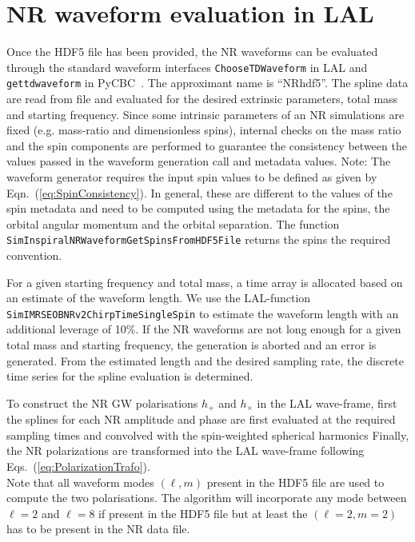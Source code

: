 \documentclass[11pt,tightenlines,article,amssymb,amsmath,amsfonts,superscriptaddress,nofootinbib]{revtex4}
\begin{document}
\section{NR waveform evaluation in LAL}
\label{sec:gen}
Once the HDF5 file has been provided, the NR waveforms can be evaluated through the standard waveform interfaces \texttt{ChooseTDWaveform} in LAL and \texttt{get\textunderscore td\textunderscore waveform} in PyCBC~\cite{Canton:2014ena}. The approximant name is ``NR\textunderscore hdf5''. 
The spline data are read from file and evaluated for the desired extrinsic parameters, total mass and starting frequency. Since some intrinsic parameters of an NR simulations are fixed (e.g. mass-ratio and dimensionless spins), internal checks on the mass ratio and the spin components are performed to guarantee the consistency between the values passed in the waveform generation call and metadata values. 
Note: The waveform generator requires the input spin values to be defined as given by Eqn.~(\ref{eq:SpinConsistency}). In general, these are different to the values of the spin metadata and need to be computed using the metadata for the spins, the orbital angular momentum and the orbital separation. The function \texttt{SimInspiralNRWaveformGetSpinsFromHDF5File} returns the spins the required convention. 

For a given starting frequency and total mass, a time array is allocated based on an estimate of the waveform length. We use the LAL-function 
\texttt{SimIMRSEOBNRv2ChirpTimeSingleSpin} to estimate the waveform length with an additional leverage of 10\%. If the NR waveforms are not long enough for a given total mass and starting frequency, the generation is aborted and an error is generated. From the estimated length and the desired sampling rate, the discrete time series for the spline evaluation is determined.

To construct the NR GW polarisations $h_+$ and $h_\times$ in the LAL
wave-frame, first the splines for each NR amplitude and phase are
first evaluated at the required sampling times and convolved with the
spin-weighted spherical harmonics
Finally, the NR polarizations are transformed into the LAL wave-frame following Eqs.~(\ref{eq:PolarizationTrafo}). \\
Note that all waveform modes $(\ell, m)$ present in the HDF5 file are used
to compute the two polarisations. The algorithm will incorporate any mode between $\ell =2$ and $\ell =8$ if present in the
HDF5 file but at least the $(\ell=2, m=2)$ has to be present in the NR data file. 
\end{document}
